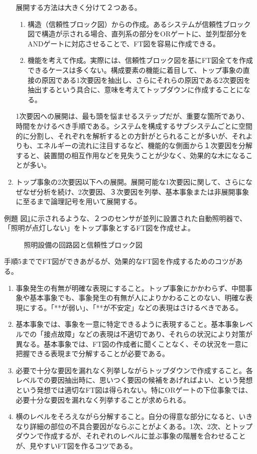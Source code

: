 \begin{enumerate}
展開する方法は大きく分けて２つある。
\begin{enumerate}
\item 構造（信頼性ブロック図）からの作成。あるシステムが信頼性ブロック図で構造が示される場合、直列系の部分をORゲートに、並列型部分をANDゲートに対応させることで、FT図を容易に作成できる。
\item 機能を考えて作成。実際には、信頼性ブロック図を基にFT図全てを作成できるケースは多くない。構成要素の機能に着目して、トップ事象の直接の原因である1次要因を抽出し、さらにそれらの原因である2次要因を抽出するという具合に、意味を考えてトップダウンに作成することになる。
\end{enumerate}
1次要因への展開は、最も頭を悩ませるステップだが、重要な箇所であり、時間をかけるべき手順である。システムを構成するサブシステムごとに空間的に分割し、それぞれを解析するとの方針がとられることが多いが、それよりも、エネルギーの流れに注目するなど、機能的な側面から１次要因を分解すると、装置間の相互作用などを見失うことが少なく、効果的な木になることが多い。
\item トップ事象の2次要因以下への展開。展開可能な1次要因に関して、さらになぜなぜ分析を続け、2次要因、３次要因を列挙、基本事象または非展開事象に至るまで論理記号を用いて展開する。
\end{enumerate}
例題 図\ref{41}に示されるような、２つのセンサが並列に設置された自動照明器で、「照明が点灯しない」をトップ事象とするFT図を作成せよ。
\begin{figure}[htbp]
\begin{center}
\end{center}
\caption{照明設備の回路図と信頼性ブロック図}
\label{41}
\end{figure}

手順5まででFT図ができあがるが、効果的なFT図を作成するためのコツがある。
\renewcommand{\labelenumi}{\roman{enumi})}

\begin{enumerate}
\item 事象発生の有無が明確な表現にすること。トップ事象にかかわらず、中間事象や基本事象でも、事象発生の有無が人によりかわることのない、明確な表現にする。「**が弱い」、「**が不安定」などの表現はさけるべきである。
\item 基本事象では、事象を一意に特定できるように表現すること。基本事象レベルでの「接点故障」などの表現は不適切であり、それらの状況により対策が異なる。基本事象では、FT図の作成者に聞くことなく、その状況を一意に把握できる表現まで分解することが必要である。
\item 必要で十分な要因を漏れなく列挙しながらトップダウンで作成すること。各レベルでの要因抽出時に、思いつく要因の候補をあげればよい、という発想という発想では適切なFT図は得られない。特にORゲートの下位事象では、必要十分な要因を漏れなく列挙することが求められる。
\item 横のレベルをそろえながら分解すること。自分の得意な部分になると、いきなり詳細の部位の不具合要因がならぶことがよくある。1次、2次、とトップダウンで作成するが、それぞれのレベルに並ぶ事象の階層を合わせることが、見やすいFT図を作るコツである。
\end{enumerate}
